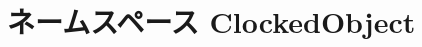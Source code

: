 \hypertarget{namespaceClockedObject}{
\section{ネームスペース ClockedObject}
\label{namespaceClockedObject}
}
